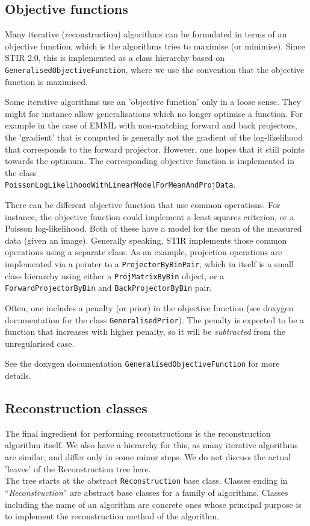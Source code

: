 \documentclass{article}
\begin{document}
\subsection{Objective functions}
Many iterative (reconstruction) algorithms can be formulated in terms
of an objective function, which is the algorithms tries to 
maximise (or minimise). Since STIR 2.0, this is implemented
as a class hierarchy based on \texttt{GeneralisedObjectiveFunction},
where we use the convention that the objective function is maximised. 

Some iterative algorithms use an 'objective function' only in a 
loose sense. They might for instance allow generalisations 
which no longer optimise a function. For example in the case
of EMML with non-matching forward and back projectors, the 'gradient' 
that is computed is generally not the gradient of the
log-likelihood that corresponds to the forward projector.
However, one hopes that it still points towards the optimum.
The corresponding objective function is implemented in the class\\
\texttt{PoissonLogLikelihoodWithLinearModelForMeanAndProjData}.

There can be different objective function that use common operations.
For instance, the objective function could implement a least squares
criterion, or a Poisson log-likelihood. Both of these have a model
for the mean of the measured data (given an image). Generally speaking,
STIR implements those common operations using a separate class.
As an example, projection operations are implemented via a pointer to a 
\texttt{ProjectorByBinPair}, which in itself is a small
class hierarchy using either a \texttt{ProjMatrixByBin} object, 
or a \texttt{ForwardProjectorByBin} and \texttt{BackProjectorByBin} pair.

Often, one includes a penalty (or prior) in the objective function
(see doxygen documentation for the class \texttt{GeneralisedPrior}).
The penalty is expected to be a function that increases with higher 
penalty, so it will be \textit{subtracted}
from the unregularised case.

See the doxygen documentation \texttt{GeneralisedObjectiveFunction} for
more details.

\subsection{
Reconstruction classes}

The final ingredient for performing reconstructions is the reconstruction 
algorithm itself. We also have a hierarchy for this, as many 
iterative algorithms are similar, and differ only in some minor 
steps. We do not discuss the actual 'leaves' of the Reconstruction 
tree here.
\\
The tree starts at the abstract \texttt{Reconstruction} base class. Classes 
ending in ``\textit{Reconstruction}'' are abstract base classes for 
a family of algorithms. Classes including the name of an algorithm 
are concrete ones whose principal purpose is to implement the 
reconstruction method of the algorithm. 
\end{document}
